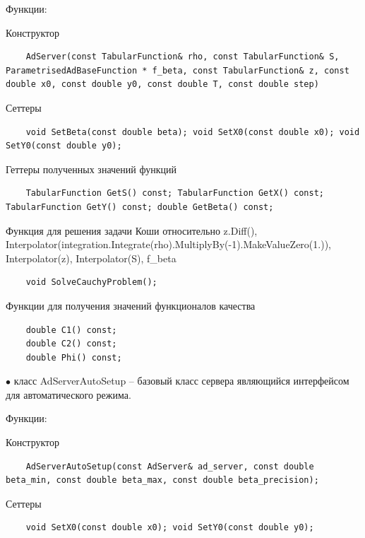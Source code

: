 \documentclass{article}
\theoremstyle{definition}
\theoremstyle{remark}
\begin{document}
Функции:

Конструктор

\begin{lstlisting}
	AdServer(const TabularFunction& rho, const TabularFunction& S, ParametrisedAdBaseFunction * f_beta, const TabularFunction& z, const double x0, const double y0, const double T, const double step)
\end{lstlisting}


Сеттеры

\begin{lstlisting}
	void SetBeta(const double beta); void SetX0(const double x0); void SetY0(const double y0);
\end{lstlisting}

Геттеры полученных значений функций

\begin{lstlisting}
	TabularFunction GetS() const; TabularFunction GetX() const; TabularFunction GetY() const; double GetBeta() const;
\end{lstlisting}

Функция для решения задачи Коши относительно z.Diff(), Interpolator(integration.Integrate(rho).MultiplyBy(-1).MakeValueZero(1.)), Interpolator(z), Interpolator(S), f\_beta

\begin{lstlisting}
	void SolveCauchyProblem();

\end{lstlisting}


Функции для получения значений функционалов качества

\begin{lstlisting}
	double C1() const;
	double C2() const;
	double Phi() const;

\end{lstlisting}



$\bullet$ класс AdServerAutoSetup --  базовый класс сервера являющийся интерфейсом для автоматического режима.

Функции:

Конструктор

\begin{lstlisting}
	AdServerAutoSetup(const AdServer& ad_server, const double beta_min, const double beta_max, const double beta_precision);
\end{lstlisting}

Сеттеры

\begin{lstlisting}
	void SetX0(const double x0); void SetY0(const double y0);

\end{lstlisting}
\end{document}
